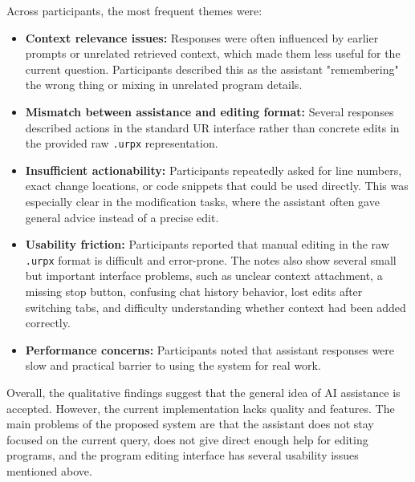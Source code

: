 Across participants, the most frequent themes were:
\begin{itemize}
    \item \textbf{Context relevance issues:} Responses were often influenced by earlier prompts or unrelated retrieved context, which made them less useful for the current question. Participants described this as the assistant "remembering" the wrong thing or mixing in unrelated program details.
    \item \textbf{Mismatch between assistance and editing format:} Several responses described actions in the standard UR interface rather than concrete edits in the provided raw \texttt{.urpx} representation.
    \item \textbf{Insufficient actionability:} Participants repeatedly asked for line numbers, exact change locations, or code snippets that could be used directly. This was especially clear in the modification tasks, where the assistant often gave general advice instead of a precise edit.
    \item \textbf{Usability friction:} Participants reported that manual editing in the raw \texttt{.urpx} format is difficult and error-prone. The notes also show several small but important interface problems, such as unclear context attachment, a missing stop button, confusing chat history behavior, lost edits after switching tabs, and difficulty understanding whether context had been added correctly.
    \item \textbf{Performance concerns:} Participants noted that assistant responses were slow and practical barrier to using the system for real work.
\end{itemize}

Overall, the qualitative findings suggest that the general idea of AI assistance is accepted. However, the current implementation lacks quality and features. The main problems of the proposed system are that the assistant does not stay focused on the current query, does not give direct enough help for editing programs, and the program editing interface has several usability issues mentioned above.

